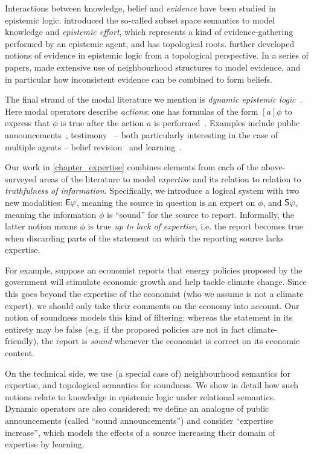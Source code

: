 {Interactions between knowledge, belief and \emph{evidence} have been studied in
epistemic logic. \textcite{moss1992topological} introduced the so-called subset
space semantics to model knowledge and \emph{epistemic effort}, which
represents a kind of evidence-gathering performed by an epistemic agent, and
has topological roots. \textcite{ozgun_evidence} further developed notions of
evidence in epistemic logic from a topological perspective. In a series of
papers, \textcite{van2011dynamic,van2012evidence,vanbenthem2014106} made
extensive use of neighbourhood structures to model evidence, and in particular
how inconsistent evidence can be combined to form beliefs.

The final strand of the modal literature we mention is \emph{dynamic epistemic
logic}~\cite{van_Ditmarsch_2008,sep_del}. Here modal operators describe
\emph{actions}: one has formulas of the form $[a]\phi$ to express that $\phi$
is true after the action $a$ is performed~\cite{sep_del}. Examples include
public announcements~\cite{plaza2007logics},
testimony~\cite{holliday2009dynamic} -- both particularly interesting in the
case of multiple agents -- belief revision~\cite{baltag2008qualitative} and
learning~\cite{gierasimczuk2009bridging,gierasimczuk2010knowing}.

Our work in \cref{chapter_expertise} combines elements from each of the
above-surveyed areas of the literature to model \emph{expertise} and its
relation to relation to \emph{truthfulness of information}. Specifically, we
introduce a logical system with two new modalities: $\E\phi$, meaning the
source in question is an expert on $\phi$, and $\S\phi$, meaning the
information $\phi$ is ``sound'' for the source to report. Informally, the
latter notion means $\phi$ is true \emph{up to lack of expertise}, i.e. the
report becomes true when discarding parts of the statement on which the
reporting source lacks expertise.

For example, suppose an economist reports that energy policies proposed by the
government will stimulate economic growth and help tackle climate change. Since
this goes beyond the expertise of the economist (who we assume is not a climate
expert), we should only take their comments on the economy into account. Our
notion of soundness models this kind of filtering: whereas the statement in its
entirety may be false (e.g. if the proposed policies are not in fact
climate-friendly), the report is \emph{sound} whenever the economist is correct
on its economic content.

On the technical side, we use (a special case of) neighbourhood semantics for
expertise, and topological semantics for soundness. We show in detail how such
notions relate to knowledge in epistemic logic under relational semantics.
Dynamic operators are also considered; we define an analogue of public
announcements (called ``sound announcements'') and consider ``expertise
increase'', which models the effects of a source increasing their domain of
expertise by learning.

}
